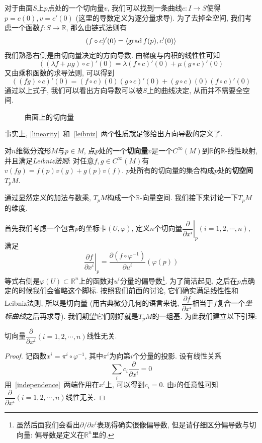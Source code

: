 对于曲面$S$上$p$点处的一个切向量$v$, 我们可以找到一条曲线$c:I\to S$使得$p=c(0),v=c'(0)$ (这里的导数定义为逐分量求导).
为了去掉全空间, 我们考虑一个函数$f:S\to\mathbb{R}$, 那么由链式法则有
\[(f\circ c)'(0)=\langle\operatorname*{grad}{f}(p),c'(0)\rangle\]
我们熟悉右侧是由切向量决定的方向导数.
由梯度与内积的线性性可知
\begin{equation}
    ((\lambda f+\mu g)\circ c)'(0)=\lambda(f\circ c)'(0)+\mu(g\circ c)'(0)\label{linearity}
\end{equation}
又由乘积函数的求导法则, 可以得到
\begin{equation}
    ((fg)\circ c)'(0)=(f\circ c)(0)(g\circ c)'(0)+(g\circ c)(0)(f\circ c)'(0)\label{leibniz}
\end{equation}
通过以上式子, 我们可以看出方向导数可以被$S$上的曲线决定, 从而并不需要全空间.

\begin{figure}[ht]
    \centering
    
    \caption{曲面上的切向量}
\end{figure}

事实上, \eqref{linearity}~和~\eqref{leibniz}~两个性质就足够给出方向导数的定义了.

\begin{defn}
    对$n$维微分流形$M$与$p\in M$, 点$p$处的一个\textbf{切向量}$v$是一个$C^\infty(M)$到$\mathbb{R}$的$\mathbb{R}$-线性映射, 并且满足\textit{Leibniz法则}: 对任意$f,g\in C^\infty(M)$有$v(fg)=f(p)v(g)+g(p)v(f)$.
    $p$处所有的切向量的集合构成$p$处的\textbf{切空间}$T_pM$.
\end{defn}

通过显然定义的加法与数乘, $T_pM$构成一个$\mathbb{R}$-向量空间.
我们接下来讨论一下$T_pM$的维度.

首先我们考虑一个包含$p$的坐标卡$(U,\varphi)$, 定义$n$个切向量$\left.\dfrac{\partial}{\partial x^i}\right|_p(i=1,2,\cdots,n)$, 满足
\[\left.\frac{\partial f}{\partial x^i}\right|_p=\frac{\partial (f\circ\varphi^{-1})}{\partial u^i}(\varphi(p))\]
等式右侧是$\varphi(U)\subset\mathbb{R}^n$上的函数对$u^i$分量的偏导数\footnote{虽然后面我们会看出$\partial/\partial x^i$表现得确实很像偏导数, 但是请仔细区分偏导数与切向量: 偏导数是定义在$\mathbb{R}^n$里的.}.
为了简洁起见, 之后在$p$点确定的时候我们会省略这个脚标.
按照我们前面的讨论, 它们确实满足线性性和Leibniz法则, 所以是切向量 (用古典微分几何的语言来说, $\dfrac{\partial f}{\partial x^i}$相当于$f$复合一个\textit{坐标曲线}之后再求导).
我们期望它们刚好就是$T_pM$的一组基.
为此我们建立以下引理:

\begin{lem}\label{lem_indep}
    切向量$\dfrac{\partial}{\partial x^i}(i=1,2,\cdots,n)$线性无关.
\end{lem}
\begin{proof}
    记函数$x^i=\pi^i\circ\varphi^{-1}$, 其中$\pi^i$为向第$i$个分量的投影.
    设有线性关系
    \begin{equation}
        \sum_ic_i\frac{\partial}{\partial x^i}=0\label{independence}
    \end{equation}
    用~\eqref{independence}~两端作用在$x^i$上, 可以得到$c_i=0$.
    由$i$的任意性可知$\dfrac{\partial}{\partial x^i}(i=1,2,\cdots,n)$线性无关.
\end{proof}

